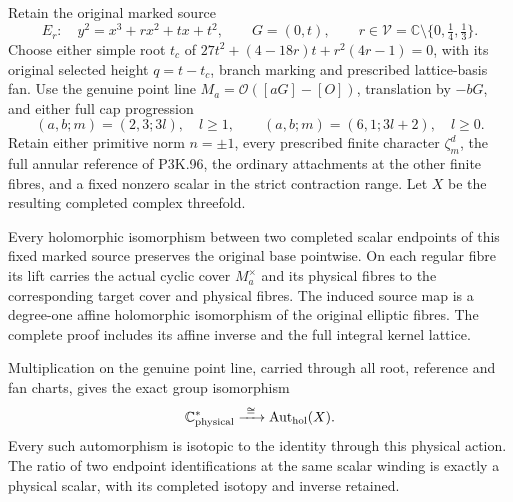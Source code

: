 \begin{theorem}\label{night:P3K.113}
Retain the original marked source
\[
 E_r:\quad y^2=x^3+rx^2+tx+t^2,\qquad G=(0,t),\qquad
 r\in\mathcal V=\mathbb C\setminus\{0,\tfrac14,\tfrac13\}.
\]
Choose either simple root \(t_c\) of
\(27t^2+(4-18r)t+r^2(4r-1)=0\), with its original selected
height \(q=t-t_c\), branch marking and prescribed lattice-basis
fan. Use the genuine point line \(M_a=\mathcal O([aG]-[O])\),
translation by \(-bG\), and either full cap progression
\[
 (a,b;m)=(2,3;3l),\quad l\ge1,
 \qquad (a,b;m)=(6,1;3l+2),\quad l\ge0.
\]
Retain either primitive norm \(n=\pm1\), every prescribed finite
character \(\zeta_m^d\), the full annular reference of P3K.96,
the ordinary attachments at the other finite fibres, and a fixed
nonzero scalar in the strict contraction range. Let \(X\) be the
resulting completed complex threefold.

Every holomorphic isomorphism between two completed scalar endpoints
of this fixed marked source preserves the original base pointwise.
On each regular fibre its lift carries the actual cyclic cover
\(M_a^\times\) and its physical fibres to the corresponding
target cover and physical fibres. The induced source map is a
degree-one affine holomorphic isomorphism of the original elliptic
fibres. The complete proof includes its affine inverse and the full
integral kernel lattice.

Multiplication on the genuine point line, carried through all root,
reference and fan charts, gives the exact group isomorphism
\[
 \mathbb C^*_{\rm physical}
       \xrightarrow{\ \cong\ }\operatorname{Aut}_{\rm hol}(X).
\]
Every such automorphism is isotopic to the identity through this
physical action. The ratio of two endpoint identifications at the
same scalar winding is exactly a physical scalar, with its completed
isotopy and inverse retained.


\end{theorem}

